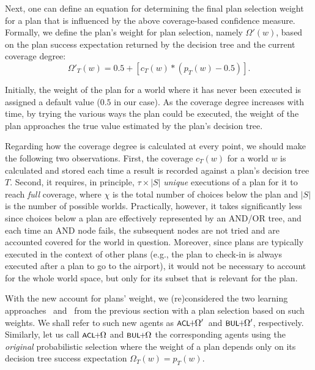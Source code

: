 Next,	 one can define an equation for determining the final plan selection
weight for a plan that is influenced by the above coverage-based confidence measure.
Formally, we define the plan's weight for plan selection, namely $\Omega'(w)$, based
on the plan success expectation returned by the decision tree and the current
coverage degree:
%
\begin{equation*}\label{eqn:coverage}   
\Omega'_T(w) = 0.5 + \left[  c_T(w) *  \left( p_T(w) - 0.5 \right)  \right].
\end{equation*}
	
	
Initially, the weight of the plan for a world where it has never been executed is
assigned a default value ($0.5$ in our case).
As the coverage degree increases with time, by trying the various ways the plan
could be executed, the weight of the plan approaches the true value estimated by
the plan's decision tree.



Regarding how the coverage degree is calculated at every point, we should make
the following two observations.
First, the coverage $c_T(w)$ for a world $w$ is calculated and stored each time a
result is recorded against a plan's decision tree $T$.
Second, it requires, in principle, $\tau \times |S|$ \emph{unique} executions of
a plan for it to reach \emph{full} coverage, where $\chi$ is the total number of
choices below the plan and $|S|$ is the number of possible worlds. Practically,
however, it takes significantly less since choices below a plan are effectively
represented by an AND/OR tree, and each time an AND node fails, the subsequent
nodes are not tried and are accounted covered for the world in question.
Moreover, since plans are typically executed in the context of other plans
(e.g., the plan to check-in is always executed after a plan to go to the
airport), it would not be necessary to account for the whole world space, but
only for its subset that is relevant for the plan.

\newcommand{\CLSELA}{\mbox{$\CL\!\!+\!\!\Omega$}}
\newcommand{\CLSELB}{\mbox{$\CL\!\!+\!\!\Omega'$}}
\newcommand{\BULSELA}{\mbox{$\BUL\!\!+\!\!\Omega$}}
\newcommand{\BULSELB}{\mbox{$\BUL\!\!+\!\!\Omega'$}}

\medskip With the new account for plans' weight, we (re)considered the two
learning approaches \CL\ and \BUL\ from the previous section with a plan
selection based on such weights. We shall refer to such new agents as \CLSELB\
and \BULSELB, respectively.
Similarly, let us call $\CLSELA$ and $\BULSELA$ the corresponding agents using
the \emph{original} probabilistic selection where the weight of a plan depends
only on its decision tree success expectation $\Omega_T(w) = p_T(w)$.


